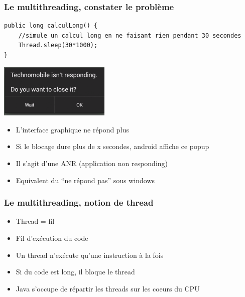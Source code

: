 \documentclass{beamer}
\begin{document}
\begin{frame}[fragile] 
\frametitle{Le multithreading, constater le problème}
\begin{lstlisting}
public long calculLong() {
    //simule un calcul long en ne faisant rien pendant 30 secondes
    Thread.sleep(30*1000);
}
\end{lstlisting}
\includegraphics[width=150pt]{img/anr.png}
\begin{itemize}
  \item L'interface graphique ne répond plus
  \item Si le blocage dure plus de x secondes, android affiche ce popup
  \item Il s'agit d'une ANR (application non responding)
  \item Equivalent du ``ne répond pas'' sous windows
\end{itemize}
\end{frame}

\begin{frame}[fragile] 
\frametitle{Le multithreading, notion de thread}
\begin{itemize}
  \item Thread = fil
  \item Fil d'exécution du code
  \item Un thread n'exécute qu'une instruction à la fois
  \item Si du code est long, il bloque le thread
  \item Java s'occupe de répartir les threads sur les coeurs du CPU
\end{itemize}
\end{frame}
\end{document}
